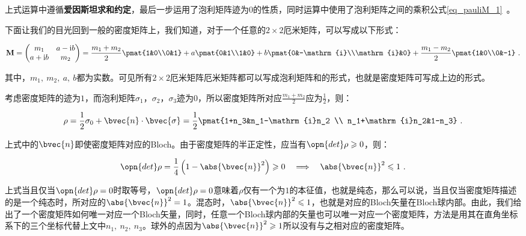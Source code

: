 上式运算中遵循\textbf{爱因斯坦求和约定}，最后一步运用了泡利矩阵迹为$0$的性质，同时运算中使用了泡利矩阵之间的乘积公式\autoref{eq_pauliM_1}~。

下面让我们的目光回到一般的密度矩阵上，我们知道，对于一个任意的$2\times 2$厄米矩阵，可以写成以下形式：

\begin{equation}
\mathbf{M} = \begin{pmatrix}
    m_1 & a - \mathrm{i}b \\
    a + \mathrm{i}b & m_2
    \end{pmatrix} = 
    \frac{m_1 + m_2}{2}\pmat{1&0\\0&1} + a\pmat{0&1\\1&0} + b\pmat{0&-\mathrm{i}\\\mathrm{i}&0} + \frac{m_1-m_2}{2}\pmat{1&0\\0&-1}~.
\end{equation}

其中，$m_1,~m_2,~a,~b$都为实数。可见所有$2\times 2$厄米矩阵厄米矩阵都可以写成泡利矩阵和的形式，也就是密度矩阵可写成上边的形式。

考虑密度矩阵的迹为$1$，而泡利矩阵$\sigma_1$，$\sigma_2$，$\sigma_3$迹为0，所以密度矩阵所对应$\frac{m_1+m_2}{2}$应为$\frac{1}{2}$，则：

\begin{equation}\label{eq_Qubit_2}
\rho = \frac{1}{2}\sigma_0 + \bvec{n}\cdot \bvec{\sigma} = \frac{1}{2}\pmat{1+n_3&n_1-\mathrm{i}n_2 \\ n_1+\mathrm{i}n_2&1-n_3}~.
\end{equation}

上式中的$\bvec{n}$即使密度矩阵对应的Bloch。由于密度矩阵的半正定性，应当有$\opn{det}\rho \geqslant 0$，则：

\begin{equation}
\opn{det}\rho = \frac{1}{4}\left( 1 - \abs{\bvec{n}}^2 \right)\geqslant0\quad \Longrightarrow \quad\abs{\bvec{n}}^2 \leqslant 1~.
\end{equation}

上式当且仅当$\opn{det} \rho = 0 $时取等号，$\opn{det}\rho = 0$意味着$\rho$仅有一个为$1$的本征值，也就是纯态，那么可以说，当且仅当密度矩阵描述的是一个纯态时，所对应的$\abs{\bvec{n}}^2 = 1$。混态时，$\abs{\bvec{n}}^2\leqslant 1$，也就是对应的Bloch矢量在Bloch球内部。由此，我们给出了一个密度矩阵如何唯一对应一个Bloch矢量，同时，任意一个Bloch球内部的矢量也可以唯一对应一个密度矩阵，方法是用其在直角坐标系下的三个坐标代替上文中$n_1,~n_2,~n_3$。球外的点因为$\abs{\bvec{n}}^2\geqslant1$所以没有与之相对应的密度矩阵。

